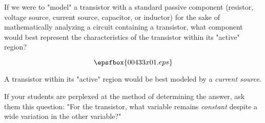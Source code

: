 

If we were to "model" a transistor with a standard passive component (resistor, voltage source, current source, capacitor, or inductor) for the sake of mathematically analyzing a circuit containing a transistor, what component would best represent the characteristics of the transistor within its "active" region?

$$\epsfbox{00433x01.eps}$$







A transistor within its "active" region would be best modeled by a {\it current source}.







If your students are perplexed at the method of determining the answer, ask them this question: "For the transistor, what variable remains {\it constant} despite a wide variation in the other variable?"





